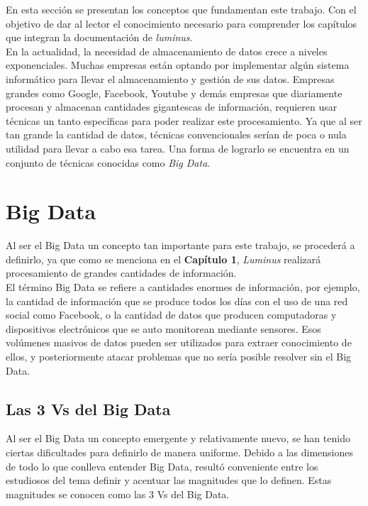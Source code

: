En esta sección se presentan los conceptos que fundamentan este trabajo. Con el objetivo de dar al lector el conocimiento necesario para comprender los capítulos que integran la documentación de \emph{luminus}.\\

En la actualidad, la necesidad de almacenamiento de datos crece a niveles exponenciales. Muchas empresas están optando por implementar algún sistema informático para llevar el almacenamiento y gestión de sus datos. Empresas grandes como Google, Facebook, Youtube y demás empresas que diariamente procesan y almacenan cantidades gigantescas de información, requieren usar técnicas un tanto específicas para poder realizar este procesamiento. Ya que al ser tan grande la cantidad de datos, técnicas convencionales serían de poca o nula utilidad para llevar a cabo esa tarea. Una forma de lograrlo se encuentra en un conjunto de técnicas conocidas como \emph{Big Data}.\\

\section{Big Data}
Al ser el Big Data un concepto tan importante para este trabajo, se procederá a definirlo, ya que como se menciona en el \textbf{Capítulo 1}, \emph{Luminus} realizará procesamiento de grandes cantidades de información.\\ 

El término Big Data se refiere a cantidades enormes de información, por ejemplo, la cantidad de información que se produce todos los días con el uso de una red social como Facebook, o la cantidad de datos que producen computadoras y dispositivos electrónicos que se auto monitorean mediante sensores. Esos volúmenes masivos de datos pueden ser utilizados para extraer conocimiento de ellos, y posteriormente atacar problemas que no sería posible resolver sin el Big Data.\cite{bigDataDef}\\

\subsection{Las 3 Vs del Big Data}
Al ser el Big Data un concepto emergente y relativamente nuevo, se han tenido ciertas dificultades para definirlo de manera uniforme. Debido a las dimensiones de todo lo que conlleva entender Big Data, resultó conveniente entre los estudiosos del tema definir y acentuar las magnitudes que lo definen. Estas magnitudes se conocen como las 3 Vs del Big Data.

